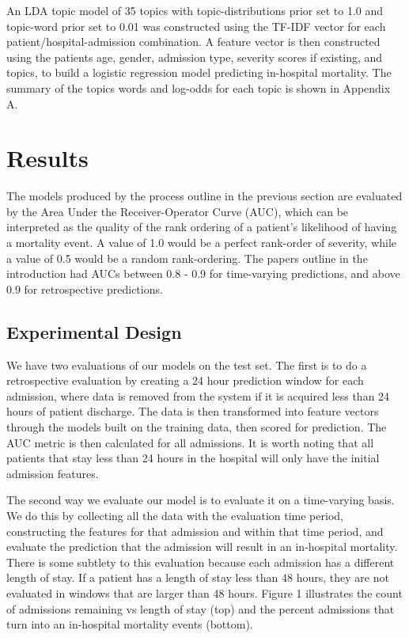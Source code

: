 \documentclass[journal]{IEEEtran}
\begin{document}
An LDA topic model of 35 topics with topic-distributions prior set to 1.0 and topic-word prior set to 0.01 was constructed using the TF-IDF vector for each patient/hospital-admission combination.  A feature vector is then constructed using the patients age, gender, admission type, severity scores if existing, and topics, to build a logistic regression model predicting in-hospital mortality.  The summary of the topics words and log-odds for each topic is shown in Appendix A.

\section{Results}

The models produced by the process outline in the previous section are evaluated by the Area Under the Receiver-Operator Curve (AUC), which can be interpreted as the quality of the rank ordering of a patient's likelihood of having a mortality event.   A value of 1.0 would be a perfect rank-order of severity, while a value of 0.5 would be a random rank-ordering.   The papers outline in the introduction had AUCs between 0.8 - 0.9 for time-varying predictions, and above 0.9 for retrospective predictions.


\subsection{Experimental Design}

We have two evaluations of our models on the test set.   The first is to do a retrospective evaluation by creating a 24 hour prediction window for each admission, where data is removed from the system if it is acquired less than 24 hours of patient discharge.  The data is then transformed into feature vectors through the models built on the training data, then scored for prediction.   The AUC metric is then calculated for all admissions.   It is worth noting that all patients that stay less than 24 hours in the hospital will only have the initial admission features.

The second way we evaluate our model is to evaluate it on a time-varying basis.  We do this by collecting all the data with the evaluation time period, constructing the features for that admission and within that time period, and evaluate the prediction that the admission will result in an in-hospital mortality.   There is some subtlety to this evaluation because each admission has a different length of stay.  If a patient has a length of stay less than 48 hours, they are not evaluated in windows that are larger than 48 hours.  Figure 1 illustrates the count of admissions remaining vs length of stay (top) and the percent admissions that turn into an in-hospital mortality events (bottom).
\end{document}
